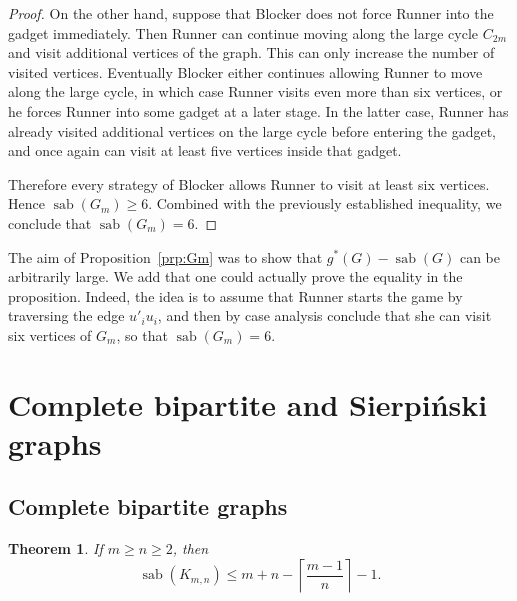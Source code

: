\documentclass[12pt]{article}
\newtheorem{theorem}{Theorem}[section]
\DeclareMathOperator{\sab}{\mathrm{sab}}
\begin{document}
\begin{proof}
On the other hand, suppose that Blocker does not force Runner into the gadget immediately. Then Runner can continue moving along the large cycle $C_{2m}$ and visit additional vertices of the graph. This can only increase the number of visited vertices. Eventually Blocker either continues allowing Runner to move along the large cycle, in which case Runner visits even more than six vertices, or he forces Runner into some gadget at a later stage. In the latter case, Runner has already visited additional vertices on the large cycle before entering the gadget, and once again can visit at least five vertices inside that gadget.

Therefore every strategy of Blocker allows Runner to visit at least six vertices. Hence
$\sab(G_m)\ge 6$. Combined with the previously established inequality, we conclude that
$\sab(G_m)=6$.
\fi
\end{proof}

The aim of Proposition~\ref{prp:Gm} was to show that $g^\ast(G) - \sab(G)$ can be arbitrarily large. We add that one could actually prove the equality in the proposition. Indeed, the idea is to assume that Runner starts the game by traversing the edge $u'_iu_i$, and then by case analysis conclude that she can visit six vertices of $G_m$, so that $\sab(G_m) = 6$. 

\section{Complete bipartite and Sierpi\'nski graphs}
\label{sec:additional}

\subsection{Complete bipartite graphs}
\label{sec:complete-bipartite}

\begin{theorem}
\label{thm:complete_bipartite}
If $m \ge n \ge 2$, then
$$\sab(K_{m,n}) \leq m+n-\left\lceil \frac{m-1}{n} \right\rceil - 1.$$
\end{theorem}
\end{document}
